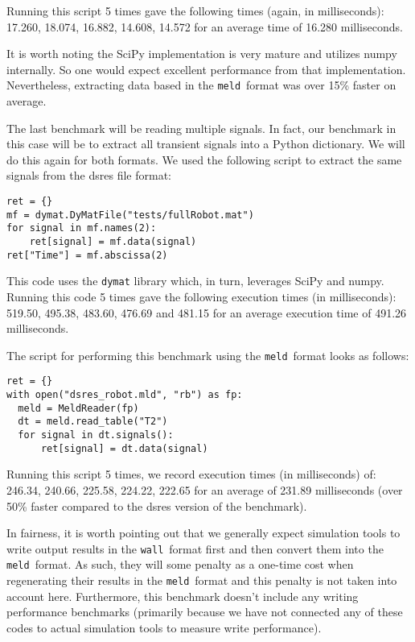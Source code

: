 \documentclass[11pt,a4paper,twocolumn]{article}
\newcommand{\wall}{\texttt{wall}}
\newcommand{\meld}{\texttt{meld}}
\newcommand{\code}[1]{\texttt{#1}} %
\begin{document}
Running this script 5 times gave the following times (again, in
milliseconds): 17.260, 18.074, 16.882, 14.608, 14.572 for an average
time of 16.280 milliseconds.

It is worth noting the SciPy implementation is very mature and
utilizes numpy internally.  So one would expect excellent performance
from that implementation.  Nevertheless, extracting data based in the
\meld\ format was over 15\% faster on average.


The last benchmark will be reading multiple signals.  In fact, our
benchmark in this case will be to extract all transient signals into a
Python dictionary.  We will do this again for both formats.  We used
the following script to extract the same signals from the dsres file
format:

\begin{verbatim}
ret = {}
mf = dymat.DyMatFile("tests/fullRobot.mat")
for signal in mf.names(2):
    ret[signal] = mf.data(signal)
ret["Time"] = mf.abscissa(2)
\end{verbatim}

This code uses the \code{dymat} library which, in turn, leverages
SciPy and numpy.  Running this code 5 times gave the following
execution times (in milliseconds): 519.50, 495.38, 483.60, 476.69 and
481.15 for an average execution time of 491.26 milliseconds.

The script for performing this benchmark using the \meld\ format looks
as follows:

\begin{verbatim}
ret = {}
with open("dsres_robot.mld", "rb") as fp:
  meld = MeldReader(fp)
  dt = meld.read_table("T2")
  for signal in dt.signals():
      ret[signal] = dt.data(signal)
\end{verbatim}

Running this script 5 times, we record execution times (in
milliseconds) of: 246.34, 240.66, 225.58, 224.22, 222.65 for an
average of 231.89 milliseconds (over 50\% faster compared to the dsres
version of the benchmark).

In fairness, it is worth pointing out that we generally expect
simulation tools to write output results in the \wall\ format first
and then convert them into the \meld\ format.  As such, they will some
penalty as a one-time cost when regenerating their results in the
\meld\ format and this penalty is not taken into account here.
Furthermore, this benchmark doesn't include any writing performance
benchmarks (primarily because we have not connected any of these codes
to actual simulation tools to measure write performance).
\end{document}
